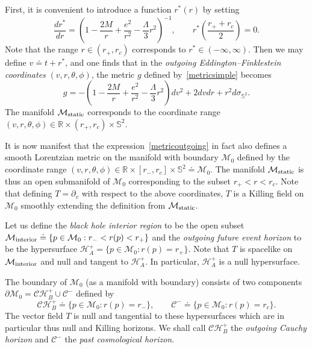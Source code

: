 \documentclass[A4,10pt]{article}
\begin{document}
First, it is convenient to introduce a function $r^*(r)$ by setting
\begin{equation}\label{rstar}
\frac{dr^*}{dr} = \left(1 - \frac{2M}{r} +\frac{e^2}{r^2} - \frac{\Lambda}{3}r^2\right)^{-1},\qquad r^*\left(\frac{r_++r_c}{2}\right) = 0.
\end{equation}
Note that the range $r \in (r_+,r_c)$ corresponds to $r^* \in (-\infty,\infty)$. Then we may define $v \doteq t+ r^*$, and one finds that in the \emph{outgoing Eddington--Finklestein coordinates} $(v,r,\theta,\phi)$, the metric $g$ defined by~\eqref{metricsimple} becomes
\begin{equation}\label{metricoutgoing}
g = -\left(1 - \frac{2M}{r} +\frac{e^2}{r^2} - \frac{\Lambda}{3}r^2\right)dv^2 + 2dvdr + r^2d\sigma_{\mathbb{S}^2}.
\end{equation}
The manifold $\mathcal{M}_{{\rm static}}$ corresponds to the coordinate range $(v,r,\theta,\phi) \in \mathbb{R} \times (r_+,r_c) \times \mathbb{S}^2$.

It is now manifest that the expression~\eqref{metricoutgoing} in fact also defines a smooth Lorentzian metric on the manifold with boundary $\mathcal{M}_0$ defined by the coordinate range
$(v,r,\theta,\phi) \in \mathbb{R} \times [r_-,r_c] \times \mathbb{S}^2\doteq \mathcal{M}_0$. 
The manifold $\mathcal{M}_{{\rm static}}$ is thus an open submanifold of
$\mathcal{M}_0$ corresponding to the subset $r_+<r<r_c$. Note that defining
$T=\partial_v$ with respect to the above coordinates, $T$ is a Killing field
on $\mathcal{M}_0$ smoothly extending 
the definition from $\mathcal{M}_{{\rm static}}$. 

Let us define the \emph{black hole interior region} to be the open subset
$\mathcal{M}_{{\rm interior}}\doteq \{p\in\mathcal{M}_0:r_-<r(p)<r_+\}$ 
and the \emph{outgoing future event horizon} to
be the hypersurface
$\mathcal{H}^+_A= \{p\in \mathcal{M}_0:r(p)=r_+\}$.  Note that $T$ is spacelike on
$\mathcal{M}_{{\rm interior}}$ and null and tangent to $\mathcal{H}^+_A$.
In particular, $\mathcal{H}^+_A$ is a null hypersurface. 

The boundary of $\mathcal{M}_0$ (as a manifold with boundary) consists
of two components $\partial\mathcal{M}_0= \mathcal{CH}^+_B\cup \mathcal{C}^-$ defined by 
\[
\mathcal{CH}^+_B \doteq \{p\in \mathcal{M}_0: r(p) = r_-\} ,\qquad \mathcal{C}^-
 \doteq \{p\in \mathcal{M}_0 :r(p) = r_c\}.
\]
The vector field $T$ is null and tangential to these hypersurfaces which
are in particular thus null and Killing horizons. We shall call $\mathcal{CH}^+_B$ the \emph{outgoing
Cauchy horizon} and $\mathcal{C}^-$ the  \emph{past cosmological horizon}.
\end{document}

